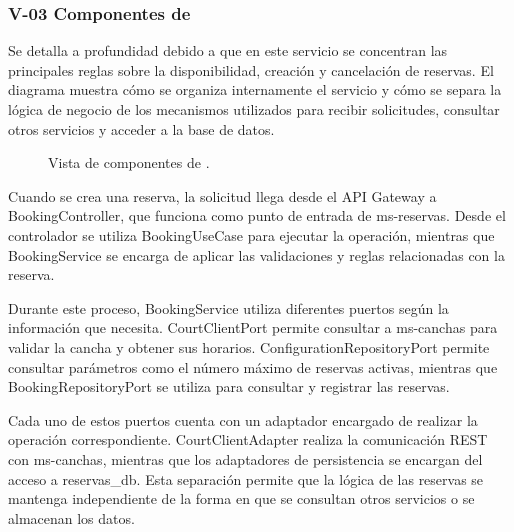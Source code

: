 \subsubsection{\texorpdfstring{\textsf{V-03}}{V-03} Componentes de }
\label{v:03}

Se detalla a profundidad  debido a que en este servicio se concentran
las principales reglas sobre la disponibilidad, creación y cancelación de reservas. 
El diagrama muestra cómo se organiza internamente el servicio y cómo se
separa la lógica de negocio de los mecanismos utilizados para recibir solicitudes,
consultar otros servicios y acceder a la base de datos.

\begin{figure}
  \centering
  \caption{Vista de componentes de .}
  \label{fig:componentes-reservas}
\end{figure}

Cuando se crea una reserva, la solicitud llega desde el API Gateway a
BookingController, que funciona como punto de entrada de ms-reservas. Desde
el controlador se utiliza BookingUseCase para ejecutar la operación, mientras
que BookingService se encarga de aplicar las validaciones y reglas relacionadas
con la reserva.

Durante este proceso, BookingService utiliza diferentes puertos según la
información que necesita. CourtClientPort permite consultar a ms-canchas para
validar la cancha y obtener sus horarios. ConfigurationRepositoryPort permite
consultar parámetros como el número máximo de reservas activas, mientras que
BookingRepositoryPort se utiliza para consultar y registrar las reservas.

Cada uno de estos puertos cuenta con un adaptador encargado de realizar la
operación correspondiente. CourtClientAdapter realiza la comunicación REST con
ms-canchas, mientras que los adaptadores de persistencia se encargan del acceso
a reservas\_db. Esta separación permite que la lógica de las reservas se mantenga
independiente de la forma en que se consultan otros servicios o se almacenan los
datos.

